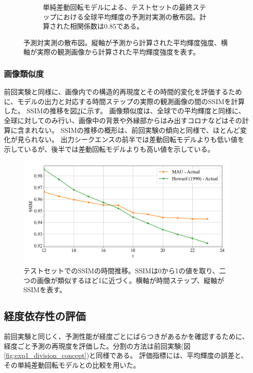 \begin{figure}[htbp]
\begin{subfigure}[b]{0.55\textwidth}
            \caption{単純差動回転モデルによる、テストセットの最終ステップにおける全球平均輝度の予測対実測の散布図。計算された相関係数は0.85である。}
          \end{subfigure}
          \caption{予測対実測の散布図。縦軸が予測から計算された平均輝度強度、横軸が実際の観測画像から計算された平均輝度強度を表す。}
          \label{fig:exp2_dr_scatter}
        \end{figure}

      \subsubsection{画像類似度}
        前回実験と同様に、画像内での構造的再現度とその時間的変化を評価するために、モデルの出力と対応する時間ステップの実際の観測画像の間のSSIMを計算した。
        SSIMの推移を図\ref{fig:exp2_ssim}に示す。
        画像類似度は、全球での平均輝度と同様に、全球に対してのみ行い、画像中の背景や外縁部からはみ出すコロナなどはその計算に含まれない。
        SSIMの推移の概形は、前回実験の傾向と同様で、ほとんど変化が見られない。
        出力シークエンスの前半では差動回転モデルよりも低い値を示しているが、後半では差動回転モデルよりも高い値を示している。
        \begin{figure}[htbp]
          \centering
          \includegraphics[width=\textwidth]{figures/exp2/average_ssim.png}
          \caption{テストセットでのSSIMの時間推移。SSIMは0から1の値を取り、二つの画像が類似するほど1に近づく。横軸が時間ステップ、縦軸がSSIMを表す。}
          \label{fig:exp2_ssim}
        \end{figure}

        
      \subsection{経度依存性の評価}
        前回実験と同じく、予測性能が経度ごとにばらつきがあるかを確認するために、経度ごと予測の再現度を評価した。分割の方法は前回実験(図\ref{fig:exp1_division_concept})と同様である。
        評価指標には、平均輝度の誤差と、その単純差動回転モデルとの比較を用いた。

